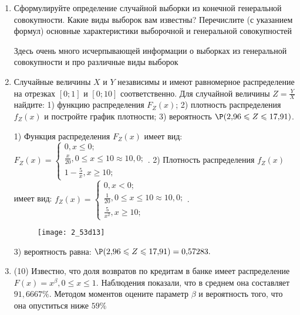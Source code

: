 \documentclass[a4paper,12pt]{article}
\begin{document}
\begin{enumerate}


\item


Сформулируйте определение случайной выборки из конечной генеральной совокупности. Какие
виды выборок вам известны? Перечислите (с указанием формул) основные характеристики выборочной и генеральной совокупностей




Здесь очень много исчерпывающей информации о выборках из генеральной совокупности и про различные виды выборок


\item



Случайные величины $X$ и $Y$ независимы и имеют равномерное
распределение на отрезках $[0;1]$ и $[0;10]$ соответственно. Для случайной величины $Z=\frac{Y}{X}$ найдите: 
1) функцию распределения $F_Z(x)$;
2) плотность распределения $f_Z(x)$ и постройте график плотности;
3) вероятность $\P(2,\!96\leqslant Z\leqslant 17,\!91)$.




1) Функция распределения $F_Z(x)$ имеет вид:
$
F_Z(x)=\left\{
\begin{array}{l}
0, x\leqslant 0;\\
\frac{x}{20}, 0\leqslant x\leqslant 10\approx 10,\!0;\\
1 - \frac{5}{x}, x\geqslant10;
\end{array}.
\right.
$
2) Плотность распределения $f_Z(x)$ имеет вид:
$
f_Z(x)=\left\{
\begin{array}{l}
0, x<0;\\
\frac{1}{20}, 0\leqslant x\leqslant 10\approx 10,\!0;\\
\frac{5}{x^{2}}, x\geqslant10;
\end{array}.
\right.
$


\begin{figure}[H]
    \texttt{[image: 2\_53d13]}
\end{figure}


3) вероятность равна:
$
\P(2,\!96\leqslant Z\leqslant 17,\!91)=
0,\!57283.
$


\item

(10) Известно, что доля возвратов по кредитам в банке имеет распределение $F(x) = x ^{\beta}, 0 \leqslant x \leqslant 1$.
Наблюдения показали, что в среднем она составляет $91,6667\%$. Методом моментов оцените параметр $\beta$ и
вероятность того, что она опуститься ниже $59\%$





\end{enumerate}
\end{document}
